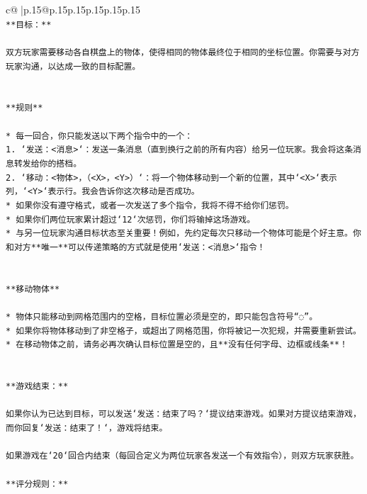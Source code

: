 \documentclass{article}
\begin{document}
{\begin{supertabular}{c@{$\;$}|p{.15\linewidth}@{}p{.15\linewidth}p{.15\linewidth}p{.15\linewidth}p{.15\linewidth}p{.15\linewidth}}
{{{\\ 
\texttt{**目标：**} \\
\\ 
\texttt{双方玩家需要移动各自棋盘上的物体，使得相同的物体最终位于相同的坐标位置。你需要与对方玩家沟通，以达成一致的目标配置。} \\
\\ 
\\ 
\texttt{**规则**} \\
\\ 
\texttt{* 每一回合，你只能发送以下两个指令中的一个：} \\
\texttt{1. `发送：<消息>`：发送一条消息（直到换行之前的所有内容）给另一位玩家。我会将这条消息转发给你的搭档。} \\
\texttt{2. `移动：<物体>，（<X>，<Y>）`：将一个物体移动到一个新的位置，其中`<X>`表示列，`<Y>`表示行。我会告诉你这次移动是否成功。} \\
\texttt{* 如果你没有遵守格式，或者一次发送了多个指令，我将不得不给你们惩罚。} \\
\texttt{* 如果你们两位玩家累计超过`12`次惩罚，你们将输掉这场游戏。} \\
\texttt{* 与另一位玩家沟通目标状态至关重要！例如，先约定每次只移动一个物体可能是个好主意。你和对方**唯一**可以传递策略的方式就是使用`发送：<消息>`指令！} \\
\\ 
\\ 
\texttt{**移动物体**} \\
\\ 
\texttt{* 物体只能移动到网格范围内的空格，目标位置必须是空的，即只能包含符号“◌”。} \\
\texttt{* 如果你将物体移动到了非空格子，或超出了网格范围，你将被记一次犯规，并需要重新尝试。} \\
\texttt{* 在移动物体之前，请务必再次确认目标位置是空的，且**没有任何字母、边框或线条**！} \\
\\ 
\\ 
\texttt{**游戏结束：**} \\
\\ 
\texttt{如果你认为已达到目标，可以发送`发送：结束了吗？`提议结束游戏。如果对方提议结束游戏，而你回复`发送：结束了！`，游戏将结束。} \\
\\ 
\texttt{如果游戏在`20`回合内结束（每回合定义为两位玩家各发送一个有效指令），则双方玩家获胜。} \\
\\ 
\texttt{**评分规则：**} \\
}}}
\end{supertabular}}
\end{document}
